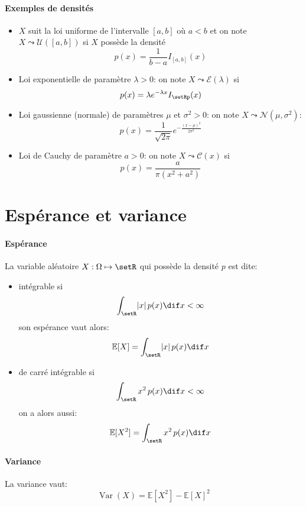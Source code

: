 \documentclass[a4paper,10pt,french,openany]{memoir}
\newcommand{\Esper}{\mathbb{E}}
\newcommand{\normale}{\mathcal{N}}
\newcommand{\uniforme}{\mathcal{U}}
\newcommand{\cauchy}{\mathcal{C}}
\newcommand{\expo}{\mathcal{E}}
\newcommand{\abs}[1]{\lvert #1 \rvert}
\DeclareMathOperator{\Var}{Var}
\begin{document}
\paragraph{Exemples de densités}
\begin{itemize}
 \item $X$ suit la loi uniforme de l'intervalle $[a,b]$ où $a<b$ et on note $X\leadsto\uniforme([a,b])$ si $X$ possède la densité \[p(x)=\frac1{b-a}I_{[a,b]}(x)\]
 
 \item Loi exponentielle de paramètre $\lambda>0$: on note $X\leadsto\expo(\lambda)$ si \[p(x)=\lambda e^{-\lambda x} I_{\setRp}(x)\]
 
 \item Loi gaussienne (normale) de paramètres $\mu$ et $\sigma^2>0$: on note $X\leadsto\normale(\mu,\sigma^2)$: \[p(x)=\frac1{\sqrt{2\pi}} e^{-\frac{(x-\mu)^2}{2\sigma^2}}\]
 
 \item Loi de Cauchy de paramètre $a>0$: on note $X\leadsto\cauchy(x)$ si \[p(x)=\frac{a}{\pi(x^2+a^2)}\]
\end{itemize}

\section{Espérance et variance}

\paragraph{Espérance}
La variable aléatoire $X:\Omega\mapsto\setR$ qui possède la densité $p$ est dite:
\begin{itemize}
 \item intégrable si \[\int_{\setR} \abs{x}\,p(x) \dif x < \infty\]
 son espérance vaut alors: \[\Esper[X] = \int_{\setR} \abs{x}\,p(x) \dif x\]
 
 \item de carré intégrable si \[\int_{\setR} x^2\,p(x) \dif x < \infty\]
 on a alors aussi: \[\Esper[X^2] = \int_{\setR} x^2\,p(x)\dif x\]
\end{itemize}

\paragraph{Variance}
La variance vaut: \[\Var(X)=\Esper[X^2]-\Esper[X]^2\]
\end{document}
